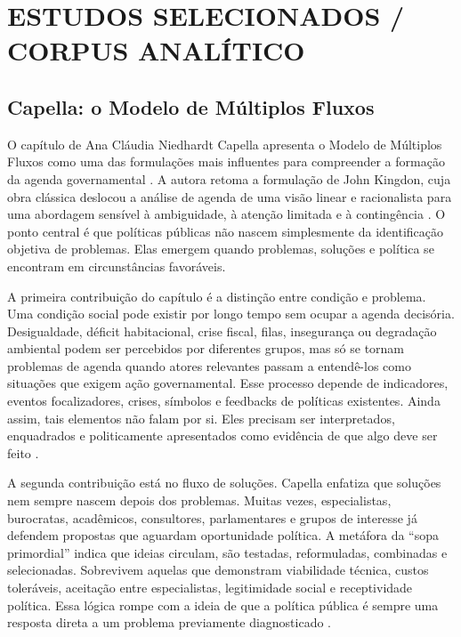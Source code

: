 \documentclass[12pt,a4paper]{article}
\begin{document}
\section{ESTUDOS SELECIONADOS / CORPUS ANALÍTICO}
\label{sec:org714b4ab}
\subsection{Capella: o Modelo de Múltiplos Fluxos}
\label{sec:org40d6d20}
O capítulo de Ana Cláudia Niedhardt Capella apresenta o Modelo de Múltiplos Fluxos como uma das formulações mais influentes para compreender a formação da agenda governamental \autocite{capella2022multiplos}. A autora retoma a formulação de John Kingdon, cuja obra clássica deslocou a análise de agenda de uma visão linear e racionalista para uma abordagem sensível à ambiguidade, à atenção limitada e à contingência \autocite{kingdon2003agendas}. O ponto central é que políticas públicas não nascem simplesmente da identificação objetiva de problemas. Elas emergem quando problemas, soluções e política se encontram em circunstâncias favoráveis.

A primeira contribuição do capítulo é a distinção entre condição e problema. Uma condição social pode existir por longo tempo sem ocupar a agenda decisória. Desigualdade, déficit habitacional, crise fiscal, filas, insegurança ou degradação ambiental podem ser percebidos por diferentes grupos, mas só se tornam problemas de agenda quando atores relevantes passam a entendê-los como situações que exigem ação governamental. Esse processo depende de indicadores, eventos focalizadores, crises, símbolos e feedbacks de políticas existentes. Ainda assim, tais elementos não falam por si. Eles precisam ser interpretados, enquadrados e politicamente apresentados como evidência de que algo deve ser feito \autocite{capella2022multiplos}.

A segunda contribuição está no fluxo de soluções. Capella enfatiza que soluções nem sempre nascem depois dos problemas. Muitas vezes, especialistas, burocratas, acadêmicos, consultores, parlamentares e grupos de interesse já defendem propostas que aguardam oportunidade política. A metáfora da “sopa primordial” indica que ideias circulam, são testadas, reformuladas, combinadas e selecionadas. Sobrevivem aquelas que demonstram viabilidade técnica, custos toleráveis, aceitação entre especialistas, legitimidade social e receptividade política. Essa lógica rompe com a ideia de que a política pública é sempre uma resposta direta a um problema previamente diagnosticado \autocites{kingdon2003agendas}[][]{capella2022multiplos}.
\end{document}
